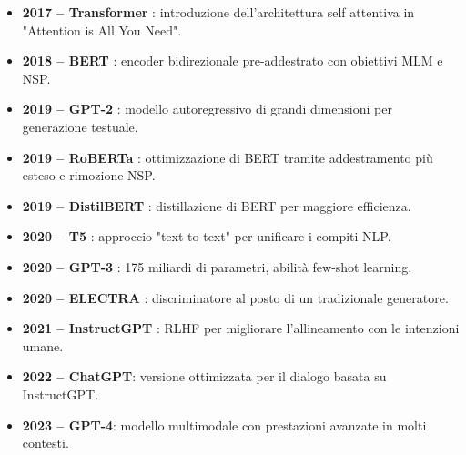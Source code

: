 \begin{itemize}
    \item \textbf{2017 – Transformer} \cite{vaswani2017attention}: introduzione dell’architettura self attentiva in "Attention is All You Need".
    \item \textbf{2018 – BERT} \cite{devlin2018bert}: encoder bidirezionale pre-addestrato con obiettivi MLM e NSP.
    \item \textbf{2019 – GPT-2} \cite{radford2019language}: modello autoregressivo di grandi dimensioni per generazione testuale.
    \item \textbf{2019 – RoBERTa} \cite{liu2019roberta}: ottimizzazione di BERT tramite addestramento più esteso e rimozione NSP.
    \item \textbf{2019 – DistilBERT} \cite{sanh2019distilbert}: distillazione di BERT per maggiore efficienza.
    \item \textbf{2020 – T5} \cite{raffel2020exploring}: approccio "text-to-text" per unificare i compiti NLP.
    \item \textbf{2020 – GPT-3} \cite{brown2020language}: 175 miliardi di parametri, abilità few-shot learning.
    \item \textbf{2020 – ELECTRA} \cite{clark2020electra}: discriminatore al posto di un tradizionale generatore.
    \item \textbf{2021 – InstructGPT} \cite{ouyang2022training}: RLHF per migliorare l’allineamento con le intenzioni umane.
    \item \textbf{2022 – ChatGPT}: versione ottimizzata per il dialogo basata su InstructGPT.
    \item \textbf{2023 – GPT-4}: modello multimodale con prestazioni avanzate in molti contesti.
\end{itemize}



